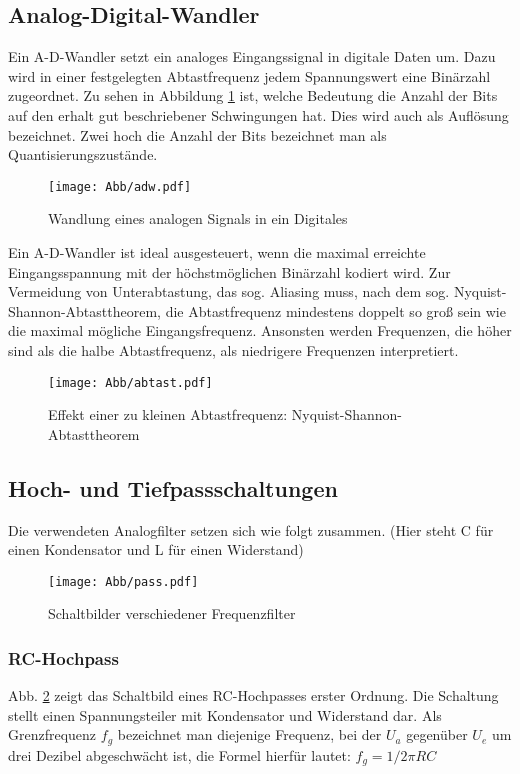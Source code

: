 \subsection{Analog-Digital-Wandler}

Ein A-D-Wandler setzt ein analoges Eingangssignal in digitale Daten um. Dazu wird in einer festgelegten Abtastfrequenz jedem Spannungswert eine Binärzahl zugeordnet.
Zu sehen in Abbildung \ref{adw} ist, welche Bedeutung die Anzahl der Bits auf den erhalt gut beschriebener Schwingungen hat. Dies wird auch als Auflösung bezeichnet. Zwei hoch die Anzahl der Bits bezeichnet man als Quantisierungszustände.
\begin{figure}[H]
     \centering     
     \texttt{[image: Abb/adw.pdf]}
     \caption{Wandlung eines analogen Signals in ein Digitales}
     \label{adw}
\end{figure}
Ein A-D-Wandler ist ideal ausgesteuert, wenn die maximal erreichte Eingangsspannung mit der höchstmöglichen Binärzahl kodiert wird. 
Zur Vermeidung von Unterabtastung, das sog. Aliasing muss, nach dem sog. Nyquist-Shannon-Abtasttheorem, die Abtastfrequenz mindestens doppelt so groß sein wie die maximal mögliche Eingangsfrequenz. Ansonsten werden Frequenzen, die höher sind als die halbe Abtastfrequenz, als niedrigere Frequenzen interpretiert.
\begin{figure}[H]
    \centering
    \texttt{[image: Abb/abtast.pdf]} 
    \caption{Effekt einer zu kleinen Abtastfrequenz: Nyquist-Shannon-Abtasttheorem}
\end{figure}

\subsection{Hoch- und Tiefpassschaltungen}
Die verwendeten Analogfilter setzen sich wie folgt zusammen.
(Hier steht C für einen Kondensator und L für einen Widerstand)
\begin{figure}[H]
    \centering
    \texttt{[image: Abb/pass.pdf]} 
    \caption{Schaltbilder verschiedener Frequenzfilter}
    \label{pass}
\end{figure}

\subsubsection{RC-Hochpass}
Abb. \ref{pass} zeigt das Schaltbild eines RC-Hochpasses erster Ordnung. Die Schaltung stellt einen Spannungsteiler mit Kondensator und Widerstand dar.
Als Grenzfrequenz $f_g$ bezeichnet man diejenige Frequenz, bei der $U_a$ gegenüber $U_e$ um drei Dezibel abgeschwächt ist, die Formel hierfür lautet: $f_g=1/2\pi R C$

